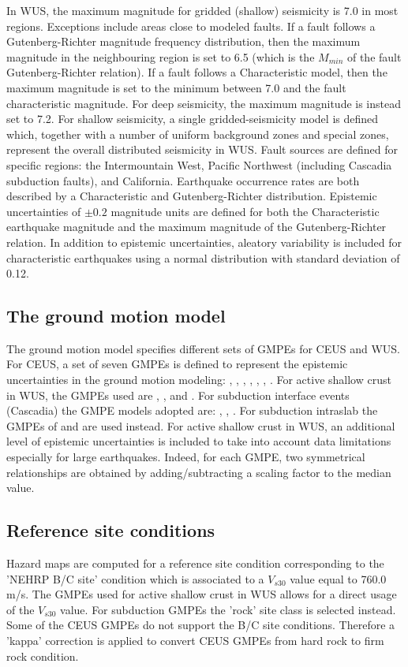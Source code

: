 In WUS, the maximum magnitude for gridded (shallow) seismicity is 7.0 in most regions. Exceptions include areas close to modeled faults. If a fault follows a Gutenberg-Richter magnitude frequency distribution, then the maximum magnitude in the neighbouring region is set to 6.5 (which is the $M_{min}$ of the fault Gutenberg-Richter relation). If a fault follows a Characteristic model, then the maximum magnitude is set to the minimum between 7.0 and the fault characteristic magnitude. For deep seismicity, the maximum magnitude is instead set to 7.2. For shallow seismicity, a single gridded-seismicity model is defined which, together with a number of uniform background zones and special zones, represent the overall distributed seismicity in WUS. Fault sources are defined for specific regions: the Intermountain West, Pacific Northwest (including Cascadia subduction faults), and California. Earthquake occurrence rates are both described by a Characteristic and Gutenberg-Richter distribution. Epistemic uncertainties of $\pm 0.2$ magnitude units are defined for both the Characteristic earthquake magnitude and the maximum magnitude of the Gutenberg-Richter relation. In addition to epistemic uncertainties, aleatory variability is included for characteristic earthquakes using a normal distribution with standard deviation of 0.12.

\subsection{The ground motion model}
The ground motion model specifies different sets of GMPEs for CEUS and WUS. For CEUS, a set of seven GMPEs is defined to represent the epistemic uncertainties in the ground motion modeling: \cite{frankel1996}, \cite{somerville2001}, \cite{campbell2003SCR}, \cite{toro1997}, \cite{atkinson2006}, \cite{tavakoli2005}, \cite{silva2002}. For active shallow crust in WUS, the GMPEs used are \cite{boore2008}, \cite{campbell2008}, and \cite{chiou2008}. For subduction interface events (Cascadia) the GMPE models adopted are: \cite{y1997}, \cite{ab2003}, \cite{zhao2006}. For subduction intraslab the GMPEs of \cite{geomatrix1993} and \cite{ab2003} are used instead. For active shallow crust in WUS, an additional level of epistemic uncertainties is included to take into account data limitations especially for large earthquakes. Indeed, for each GMPE, two symmetrical relationships are obtained by adding/subtracting a scaling factor to the median value.

\subsection{Reference site conditions}
Hazard maps are computed for a reference site condition corresponding to the 'NEHRP B/C site' condition which is associated to a $V_{s30}$ value equal to 760.0 m/s. The GMPEs used for active shallow crust in WUS allows for a direct usage of the $V_{s30}$ value. For subduction GMPEs the 'rock' site class is selected instead. Some of the CEUS GMPEs do not support the B/C site conditions. Therefore a 'kappa' correction is applied to convert CEUS GMPEs from hard rock to firm rock condition.

